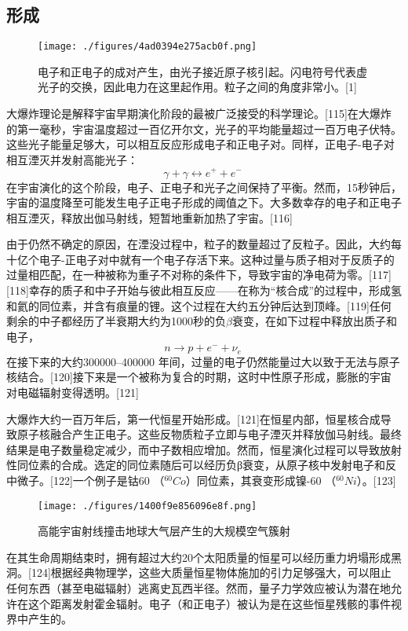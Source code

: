 \subsection{形成}
\begin{figure}[ht]
\centering
\texttt{[image: ./figures/4ad0394e275acb0f.png]}
\caption{电子和正电子的成对产生，由光子接近原子核引起。闪电符号代表虚光子的交换，因此电力在这里起作用。粒子之间的角度非常小。[1]} \label{fig_DZ_13}
\end{figure}
大爆炸理论是解释宇宙早期演化阶段的最被广泛接受的科学理论。[115]在大爆炸的第一毫秒，宇宙温度超过一百亿开尔文，光子的平均能量超过一百万电子伏特。这些光子能量足够大，可以相互反应形成电子和正电子对。同样，正电子-电子对相互湮灭并发射高能光子：
$$\gamma +\gamma\leftrightarrow e^+ +e^-~$$
在宇宙演化的这个阶段，电子、正电子和光子之间保持了平衡。然而，15秒钟后，宇宙的温度降至可能发生电子正电子形成的阈值之下。大多数幸存的电子和正电子相互湮灭，释放出伽马射线，短暂地重新加热了宇宙。[116]

由于仍然不确定的原因，在湮没过程中，粒子的数量超过了反粒子。因此，大约每十亿个电子-正电子对中就有一个电子存活下来。这种过量与质子相对于反质子的过量相匹配，在一种被称为重子不对称的条件下，导致宇宙的净电荷为零。[117][118]幸存的质子和中子开始与彼此相互反应——在称为“核合成”的过程中，形成氢和氦的同位素，并含有痕量的锂。这个过程在大约五分钟后达到顶峰。[119]任何剩余的中子都经历了半衰期大约为1000秒的负$\beta$衰变，在如下过程中释放出质子和电子，
$$n \to p +e^- +\nu_e~$$
在接下来的大约300000–400000 年间，过量的电子仍然能量过大以致于无法与原子核结合。[120]接下来是一个被称为复合的时期，这时中性原子形成，膨胀的宇宙对电磁辐射变得透明。[121]

大爆炸大约一百万年后，第一代恒星开始形成。[121]在恒星内部，恒星核合成导致原子核融合产生正电子。这些反物质粒子立即与电子湮灭并释放伽马射线。最终结果是电子数量稳定减少，而中子数相应增加。然而，恒星演化过程可以导致放射性同位素的合成。选定的同位素随后可以经历负β衰变，从原子核中发射电子和反中微子。[122]一个例子是钴60 （$^{60}Co$）同位素，其衰变形成镍-60 （$^{60}Ni$）。[123]
\begin{figure}[ht]
\centering
\texttt{[image: ./figures/1400f9e856096e8f.png]}
\caption{高能宇宙射线撞击地球大气层产生的大规模空气簇射} \label{fig_DZ_14}
\end{figure}
在其生命周期结束时，拥有超过大约20个太阳质量的恒星可以经历重力坍塌形成黑洞。[124]根据经典物理学，这些大质量恒星物体施加的引力足够强大，可以阻止任何东西（甚至电磁辐射）逃离史瓦西半径。然而，量子力学效应被认为潜在地允许在这个距离发射霍金辐射。电子（和正电子）被认为是在这些恒星残骸的事件视界中产生的。

